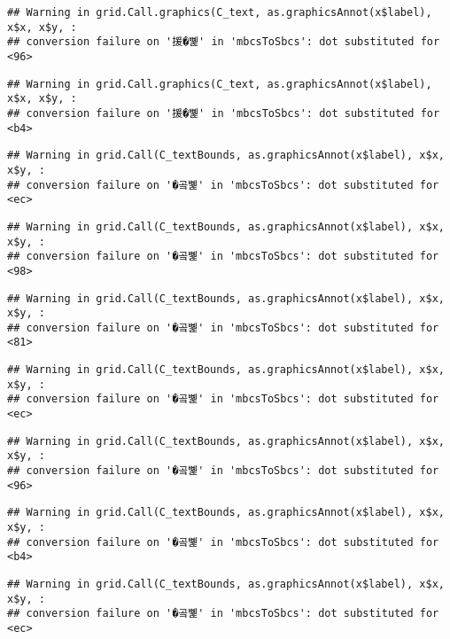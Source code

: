 \documentclass[
]{article}
\begin{document}
\begin{verbatim}
## Warning in grid.Call.graphics(C_text, as.graphicsAnnot(x$label), x$x, x$y, :
## conversion failure on '援�뼱' in 'mbcsToSbcs': dot substituted for <96>
\end{verbatim}

\begin{verbatim}
## Warning in grid.Call.graphics(C_text, as.graphicsAnnot(x$label), x$x, x$y, :
## conversion failure on '援�뼱' in 'mbcsToSbcs': dot substituted for <b4>
\end{verbatim}

\begin{verbatim}
## Warning in grid.Call(C_textBounds, as.graphicsAnnot(x$label), x$x, x$y, :
## conversion failure on '�곸뼱' in 'mbcsToSbcs': dot substituted for <ec>
\end{verbatim}

\begin{verbatim}
## Warning in grid.Call(C_textBounds, as.graphicsAnnot(x$label), x$x, x$y, :
## conversion failure on '�곸뼱' in 'mbcsToSbcs': dot substituted for <98>
\end{verbatim}

\begin{verbatim}
## Warning in grid.Call(C_textBounds, as.graphicsAnnot(x$label), x$x, x$y, :
## conversion failure on '�곸뼱' in 'mbcsToSbcs': dot substituted for <81>
\end{verbatim}

\begin{verbatim}
## Warning in grid.Call(C_textBounds, as.graphicsAnnot(x$label), x$x, x$y, :
## conversion failure on '�곸뼱' in 'mbcsToSbcs': dot substituted for <ec>
\end{verbatim}

\begin{verbatim}
## Warning in grid.Call(C_textBounds, as.graphicsAnnot(x$label), x$x, x$y, :
## conversion failure on '�곸뼱' in 'mbcsToSbcs': dot substituted for <96>
\end{verbatim}

\begin{verbatim}
## Warning in grid.Call(C_textBounds, as.graphicsAnnot(x$label), x$x, x$y, :
## conversion failure on '�곸뼱' in 'mbcsToSbcs': dot substituted for <b4>
\end{verbatim}

\begin{verbatim}
## Warning in grid.Call(C_textBounds, as.graphicsAnnot(x$label), x$x, x$y, :
## conversion failure on '�곸뼱' in 'mbcsToSbcs': dot substituted for <ec>
\end{verbatim}
\end{document}
